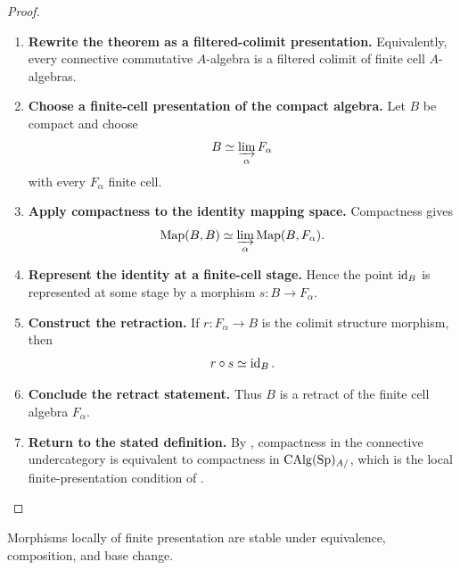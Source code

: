 \begin{proof}
\begin{enumerate}[label=\textup{(\arabic*)}]
    \item \textbf{Rewrite the theorem as a filtered-colimit presentation.}
    Equivalently, every connective commutative \(A\)-algebra is a filtered
    colimit of finite cell \(A\)-algebras.

    \item \textbf{Choose a finite-cell presentation of the compact algebra.}
    Let \(B\) be compact and choose
    \[
        B\simeq\varinjlim_\alpha F_\alpha
    \]
    with every \(F_\alpha\) finite cell.

    \item \textbf{Apply compactness to the identity mapping space.}
    Compactness gives
    \[
        \operatorname{Map}(B,B)
        \simeq
        \varinjlim_\alpha\operatorname{Map}(B,F_\alpha).
    \]

    \item \textbf{Represent the identity at a finite-cell stage.}
    Hence the point \(\operatorname{id}_B\) is represented at some stage by a morphism
    \(s:B\to F_\alpha\).

    \item \textbf{Construct the retraction.}
    If \(r:F_\alpha\to B\) is the colimit structure
    morphism, then
    \[
        r\circ s\simeq\operatorname{id}_B.
    \]

    \item \textbf{Conclude the retract statement.}
    Thus \(B\) is a retract of the finite cell algebra \(F_\alpha\).

    \item \textbf{Return to the stated definition.}
    By , compactness in the
    connective undercategory is equivalent to compactness in
    \(\operatorname{CAlg}(\operatorname{Sp})_{A/}\), which is the local finite-presentation condition of
    .
\end{enumerate}
\end{proof}

\begin{proposition}
\label{prop:finite-presentation-permanence}
Morphisms locally of finite presentation are stable under equivalence,
composition, and base change.
\end{proposition}

